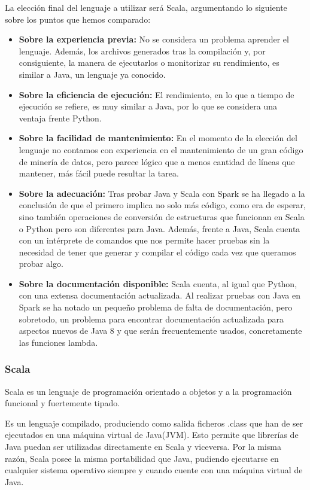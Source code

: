 \newpage


La elección final del lenguaje a utilizar será Scala, argumentando lo siguiente sobre los puntos que hemos comparado:

\begin{itemize}
	\item \textbf{Sobre la experiencia previa:} No se considera un problema aprender el lenguaje. Además, los archivos generados tras la compilación y, por consiguiente, la manera de ejecutarlos o monitorizar su rendimiento, es similar a Java, un lenguaje ya conocido.
	\item \textbf{Sobre la eficiencia de ejecución:} El rendimiento, en lo que a tiempo de ejecución se refiere, es muy similar a Java, por lo que se considera una ventaja frente Python.
	\item \textbf{Sobre la facilidad de mantenimiento:} En el momento de la elección del lenguaje no contamos con experiencia en el mantenimiento de un gran código de minería de datos, pero parece lógico que a menos cantidad de líneas que mantener, más fácil puede resultar la tarea.	
	\item \textbf{Sobre la adecuación:} Tras probar Java y Scala con Spark se ha llegado a la conclusión de que el primero implica no solo más código, como era de esperar, sino también operaciones de conversión de estructuras que funcionan en Scala o Python pero son diferentes para Java. Además, frente a Java, Scala cuenta con un intérprete de comandos que nos permite hacer pruebas sin la necesidad de tener que generar y compilar el código cada vez que queramos probar algo.
	\item \textbf{Sobre la documentación disponible:} Scala cuenta, al igual que Python, con una extensa documentación actualizada. Al realizar pruebas con Java en Spark se ha notado un pequeño problema de falta de documentación, pero sobretodo, un problema para encontrar documentación actualizada para aspectos nuevos de Java 8 y que serán frecuentemente usados, concretamente las funciones lambda.
\end{itemize}


\subsubsection{Scala}
Scala es un lenguaje de programación orientado a objetos y a la programación funcional y fuertemente tipado.

Es un lenguaje compilado, produciendo como salida ficheros .class que han de ser ejecutados en una máquina virtual de Java(JVM). Esto permite que librerías de Java puedan ser utilizadas directamente en Scala y viceversa. Por la misma razón, Scala posee la misma portabilidad que Java, pudiendo ejecutarse en cualquier sistema operativo siempre y cuando cuente con una máquina virtual de Java. 


